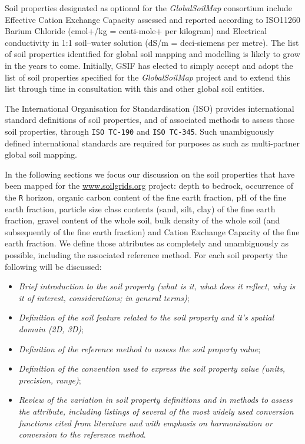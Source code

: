 \documentclass[graybox,natbib,nospthms,UStrade]{svmono}
\begin{document}
Soil properties designated as optional for the \emph{GlobalSoilMap}
consortium include Effective Cation Exchange Capacity assessed and
reported according to ISO11260 Barium Chloride (cmol+/kg = centi-mole+ per kilogram)
and Electrical conductivity in 1:1 soil--water solution (dS/m = deci-siemens per metre).
The list of soil properties identified for global soil mapping and
modelling is likely to grow in the years to come. Initially,
GSIF has elected to simply accept and adopt the list of soil properties
specified for the \emph{GlobalSoilMap}
project and to extend this list through time in consultation with this
and other global soil entities.

The International Organisation for Standardisation (ISO) provides
international standard definitions of soil properties, and of associated
methods to assess those soil properties, through \texttt{ISO\ TC-190} and
\texttt{ISO\ TC-345}. Such unambiguously defined international standards are
required for purposes as such as multi-partner global soil mapping.

In the following sections we focus our discussion on the soil properties
that have been mapped for the \url{www.soilgrids.org} project:
depth to bedrock, occurrence of the \texttt{R} horizon, organic carbon content of the fine earth
fraction, pH of the fine earth fraction, particle size class contents
(sand, silt, clay) of the fine earth fraction, gravel content of the
whole soil, bulk density of the whole soil (and subsequently of the fine
earth fraction) and Cation Exchange Capacity of the fine earth fraction.
We define those attributes as completely and unambiguously as possible,
including the associated reference method. For each soil property the
following will be discussed:

\begin{itemize}
\item
  \emph{Brief introduction to the soil property (what is it, what does it
  reflect, why is it of interest, considerations; in general terms)};
\item
  \emph{Definition of the soil feature related to the soil property and
  it's spatial domain (2D, 3D)};
\item
  \emph{Definition of the reference method to assess the soil property
  value};
\item
  \emph{Definition of the convention used to express the soil property value
  (units, precision, range)};
\item
  \emph{Review of the variation in soil property definitions and in methods
  to assess the attribute, including listings of several of the most
  widely used conversion functions cited from literature and with
  emphasis on harmonisation or conversion to the reference method}.
\end{itemize}
\end{document}
